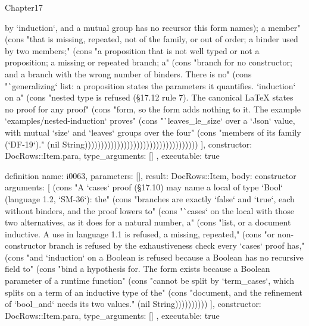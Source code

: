 \begin{lexlean}{Chapter17}
\begin{semanticmodule}
{{by `induction`, and a mutual group has no recursor this form names); a member" (cons "that is missing, repeated, not of the family, or out of order; a binder used by two members;" (cons "a proposition that is not well typed or not a proposition; a missing or repeated branch; a" (cons "branch for no constructor; and a branch with the wrong number of binders. There is no" (cons "`generalizing` list: a proposition states the parameters it quantifies. `induction` on a" (cons "nested type is refused (§17.12 rule 7). The canonical LaTeX states no proof for any proof" (cons "form, so the form adds nothing to it. The example `examples/nested-induction` proves" (cons "`leaves_le_size` over a `Json` value, with mutual `size` and `leaves` groups over the four" (cons "members of its family (`DF-19`)." (nil String)))))))))))))))))))))))))))))))))))
    ],
    constructor: DocRows::Item.para,
    type_arguments: []
  },
  executable: true
}

definition{
  name: i0063,
  parameters: [],
  result: DocRows::Item,
  body: constructor{
    arguments: [
      (cons "A `cases` proof (§17.10) may name a local of type `Bool` (language 1.2, `SM-36`): the" (cons "branches are exactly `false` and `true`, each without binders, and the proof lowers to" (cons "`cases` on the local with those two alternatives, as it does for a natural number, a" (cons "list, or a document inductive. A use in language 1.1 is refused, a missing, repeated," (cons "or non-constructor branch is refused by the exhaustiveness check every `cases` proof has," (cons "and `induction` on a Boolean is refused because a Boolean has no recursive field to" (cons "bind a hypothesis for. The form exists because a Boolean parameter of a runtime function" (cons "cannot be split by `term_cases`, which splits on a term of an inductive type of the" (cons "document, and the refinement of `bool_and` needs its two values." (nil String))))))))))
    ],
    constructor: DocRows::Item.para,
    type_arguments: []
  },
  executable: true
}


\end{semanticmodule}
\end{lexlean}
